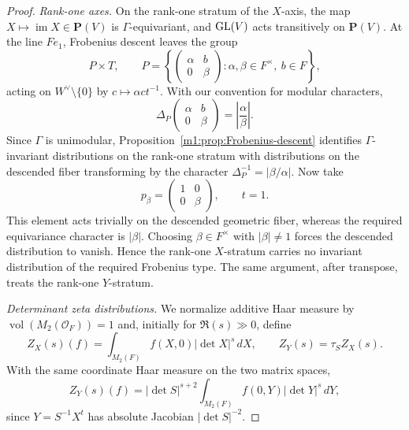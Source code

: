 \begin{proof}
\emph{Rank-one axes.} On the rank-one stratum of the $X$-axis, the map \(X\longmapsto \operatorname{im}X\in
\mathbf P(V)\) is $\Gamma$-equivariant, and $\operatorname{GL}(V)$ acts transitively on $\mathbf P(V)$.
At the line $Fe_1$, Frobenius descent leaves the group
\[
    P\times T,
    \qquad
    P=
    \left\{
    \begin{pmatrix}
        \alpha&b\\0&\beta
    \end{pmatrix}:
    \alpha,\beta\in F^\times,\ b\in F
    \right\},
\]
acting on $W^\vee\setminus\{0\}$ by \(c\longmapsto \alpha c t^{-1}\). With our convention for
modular characters,
\[
    \Delta_P
    \begin{pmatrix}
        \alpha&b\\0&\beta
    \end{pmatrix}
    =\left|\frac{\alpha}{\beta}\right|.
\]
Since $\Gamma$ is unimodular, Proposition~\ref{m1:prop:Frobenius-descent} identifies $\Gamma$-invariant
 distributions on the rank-one stratum with distributions on the descended
fiber transforming by the character $\Delta_P^{-1}=|\beta/\alpha|$.  Now take
\[
    p_\beta=\begin{pmatrix}1&0\\0&\beta\end{pmatrix},
    \qquad t=1.
\]
This element acts trivially on the descended geometric fiber, whereas the
required equivariance character is $|\beta|$.  Choosing
$\beta\in F^\times$ with $|\beta|\neq1$ forces the descended distribution to
vanish.  Hence the rank-one $X$-stratum carries no invariant distribution of
the required Frobenius type.  The same argument, after transpose, treats the
rank-one $Y$-stratum.

\emph{Determinant zeta distributions.}\label{m1:para:det-zeta}
We normalize additive Haar measure by
$\operatorname{vol}(M_2(\mathcal O_F))=1$ and, initially for
$\Re(s)\gg0$, define
\[
 Z_X(s)(f)=\int_{M_2(F)}f(X,0)|\det X|^s\,dX,
 \qquad Z_Y(s)=\tau_S Z_X(s).
\]
With the same coordinate Haar measure on the two matrix spaces,
\[
 Z_Y(s)(f)=|\det S|^{s+2}
       \int_{M_2(F)}f(0,Y)|\det Y|^s\,dY,
\]
since $Y=S^{-1}X^t$ has absolute Jacobian $|\det S|^{-2}$.


\end{proof}
